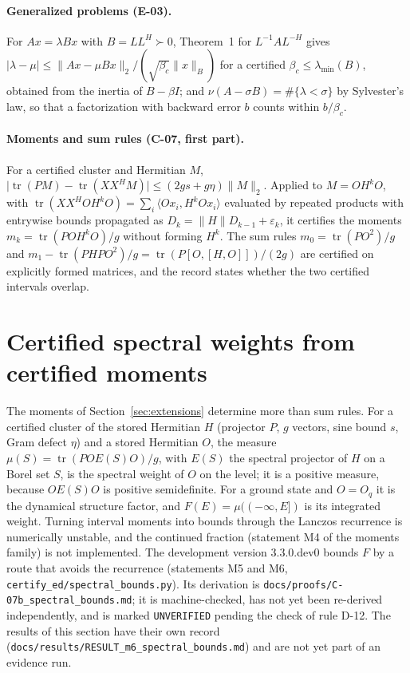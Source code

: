 \documentclass[11pt,a4paper]{article}
\newcommand{\code}[1]{\texttt{#1}}
\newcommand{\norm}[1]{\lVert #1\rVert}
\newcommand{\abs}[1]{\lvert #1\rvert}
\newcommand{\tr}{\operatorname{tr}}
\begin{document}
\paragraph{Generalized problems (E-03).}
For $Ax=\lambda Bx$ with $B=LL^H\succ0$, Theorem~1 for $L^{-1}AL^{-H}$ gives $\abs{\lambda-\mu}\le\norm{Ax-\mu
Bx}_2/(\sqrt{\beta_c}\norm{x}_B)$ for a certified $\beta_c\le\lambda_{\min}(B)$, obtained from the inertia of
$B-\beta I$; and $\nu(A-\sigma B)=\#\{\lambda<\sigma\}$ by Sylvester's law, so that a factorization with backward error
$b$ counts within $b/\beta_c$.

\paragraph{Moments and sum rules (C-07, first part).}
For a certified cluster and Hermitian $M$, $\abs{\tr(PM)-\tr(XX^HM)}\le(2gs+g\eta)\norm{M}_2$. Applied to
$M=OH^kO$, with $\tr(XX^HOH^kO)=\sum_i\langle Ox_i,H^kOx_i\rangle$ evaluated by repeated products with entrywise bounds
propagated as $D_k=\norm{H}D_{k-1}+\varepsilon_k$, it certifies the moments $m_k=\tr(POH^kO)/g$ without forming $H^k$.
The sum rules $m_0=\tr(PO^2)/g$ and $m_1-\tr(PHPO^2)/g=\tr(P[O,[H,O]])/(2g)$ are certified on explicitly formed
matrices, and the record states whether the two certified intervals overlap.

\section{Certified spectral weights from certified moments}
\label{sec:spectral}

The moments of Section~\ref{sec:extensions} determine more than sum rules. For a certified cluster of the stored
Hermitian $H$ (projector $P$, $g$ vectors, sine bound $s$, Gram defect $\eta$) and a stored Hermitian $O$, the
measure $\mu(S)=\tr(POE(S)O)/g$, with $E(S)$ the spectral projector of $H$ on a Borel set $S$, is the spectral weight
of $O$ on the level; it is a positive measure, because $OE(S)O$ is positive semidefinite. For a ground state and
$O=O_q$ it is the dynamical structure factor, and $F(E)=\mu((-\infty,E])$ is its integrated weight. Turning
interval moments into bounds through the Lanczos recurrence is numerically unstable, and the continued fraction
(statement M4 of the moments family) is not implemented. The development version 3.3.0.dev0 bounds $F$ by a route that
avoids the recurrence (statements M5 and M6, \code{certify\_ed/spectral\_bounds.py}). Its derivation is
\code{docs/proofs/C-07b\_spectral\_bounds.md}; it is machine-checked, has not yet been re-derived independently, and is
marked \code{UNVERIFIED} pending the check of rule D-12. The results of this section have their own record
(\code{docs/results/RESULT\_m6\_spectral\_bounds.md}) and are not yet part of an evidence run.
\end{document}
